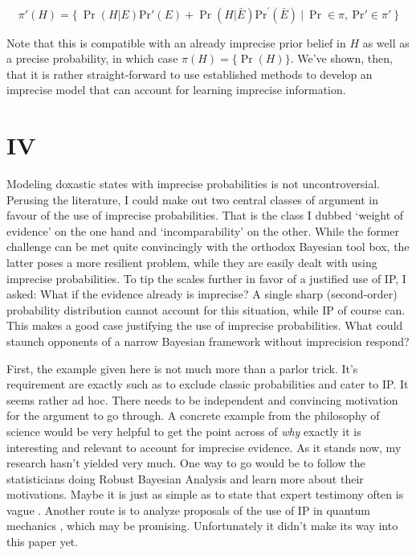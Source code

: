 \documentclass[11pt, a4paper]{scrartcl}
\begin{document}
\begin{equation*} 
    \pi'(H) = \{~ \Pr(H\vert E)\text{Pr}'(E) + \Pr(H\vert\bar{E})\text{Pr}^{\prime}(\bar{E}) ~\vert~ \Pr \in \pi,~ \text{Pr}' \in \pi'~\}
\end{equation*}

Note that this is compatible with an already imprecise prior belief in $H$ as well as a precise probability, in which case $\pi(H) = \{\Pr(H)\}$. We've shown, then, that it is rather straight-forward to use established methods to develop an imprecise model that can account for learning imprecise information.
\section{IV}

Modeling doxastic states with imprecise probabilities is not uncontroversial. Perusing the literature, I could make out two central classes of argument in favour of the use of imprecise probabilities. That is the class I dubbed `weight of evidence' on the one hand and `incomparability' on the other. While the former challenge can be met quite convincingly with the orthodox Bayesian tool box, the latter poses a more resilient problem, while they are easily dealt with using imprecise probabilities. To tip the scales further in favor of a justified use of IP, I asked: What if the evidence already is imprecise? A single sharp (second-order) probability distribution cannot account for this situation, while IP of course can. This makes a good case justifying the use of imprecise probabilities. What could staunch opponents of a narrow Bayesian framework without imprecision respond? 

First, the example given here is not much more than a parlor trick. It's requirement are exactly such as to exclude classic probabilities and cater to IP. It seems rather ad hoc. There needs to be independent and convincing motivation for the argument to go through. A concrete example from the philosophy of science would be very helpful to get the point across of \emph{why} exactly it is interesting and relevant to account for imprecise evidence. As it stands now, my research hasn't yielded very much. One way to go would be to follow the statisticians doing Robust Bayesian Analysis \citep{Berger1994} and learn more about their motivations. Maybe it is just as simple as to state that expert testimony often is vague \citep{Destercke2014}. Another route is to analyze proposals of the use of IP in quantum mechanics \citep{pittphilsci4734}, which may be promising. Unfortunately it didn't make its way into this paper yet.
\end{document}
